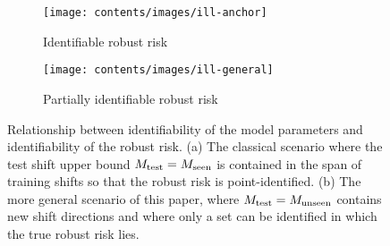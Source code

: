 \begin{figure}
\centering
\begin{subfigure}{.5\textwidth}
  \centering
  \texttt{[image: contents/images/ill-anchor]}
  \caption{Identifiable robust risk}
  \label{fig:sub1-identified}
\end{subfigure}%
\begin{subfigure}{.5\textwidth}
  \centering
  \texttt{[image: contents/images/ill-general]}
  \caption{Partially identifiable robust risk}
  \label{fig:sub2-nonidentified}
\end{subfigure}
\caption{\small{Relationship between identifiability of the model parameters and identifiability of the robust risk. (a) The classical scenario where the test shift upper bound $M_{\mathrm{test}} = M_{\text{seen}}$ is contained in the span of training shifts so that 
the robust risk is point-identified. (b) The more general scenario of this paper, where $M_{\mathrm{test}}=M_{\text{unseen}}$ contains new shift directions and where only a set can be identified in which the true robust risk lies. }}
\label{fig:test}
\end{figure}

